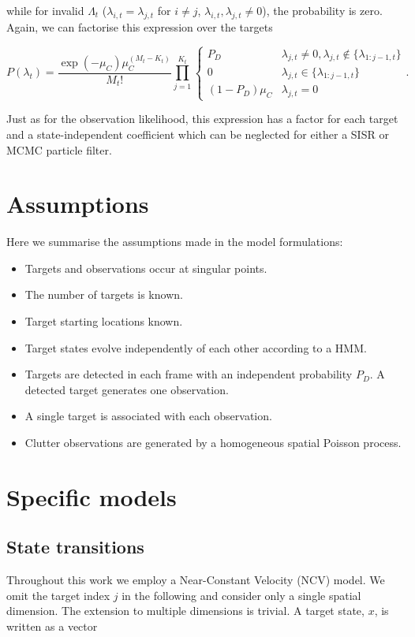 while for invalid $\Lambda_t$ ($\lambda_{i,t}=\lambda_{j,t}$ for $i \ne j$, $\lambda_{i,t},\lambda_{j,t} \ne 0$), the probability is zero. Again, we can factorise this expression over the targets

\begin{equation}
P(\lambda_t) = \frac{\exp(-\mu_C) \mu_C^{(M_t-K_t)}}{M_t!} \prod_{j=1}^{K_t} \begin{cases} P_D & \lambda_{j,t} \ne 0, \lambda_{j,t} \notin \{ \lambda_{1:j-1,t} \} \\ 0 & \lambda_{j,t} \in \{ \lambda_{1:j-1,t} \} \\ (1-P_D) \mu_C & \lambda_{j,t}=0 \end{cases}.
\label{eq:MTFactorisedAssociationLikelihood}
\end{equation}

Just as for the observation likelihood, this expression has a factor for each target and a state-independent coefficient which can be neglected for either a SISR or MCMC particle filter.



\section{Assumptions}
Here we summarise the assumptions made in the model formulations:

\begin{itemize}
	\item Targets and observations occur at singular points.
	\item The number of targets is known.
	\item Target starting locations known.
	\item Target states evolve independently of each other according to a HMM.
	\item Targets are detected in each frame with an independent probability $P_D$. A detected target generates one observation.
	\item A single target is associated with each observation.
	\item Clutter observations are generated by a homogeneous spatial Poisson process.
\end{itemize}



\section{Specific models}

\subsection{State transitions}
Throughout this work we employ a Near-Constant Velocity (NCV) model. We omit the target index $j$ in the following and consider only a single spatial dimension. The extension to multiple dimensions is trivial. A target state, $x$, is written as a vector

